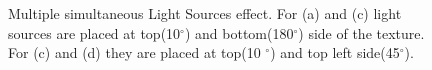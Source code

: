 \begin{figure}[h]
\centering
\caption{Multiple simultaneous Light Sources effect. For (a) and (c) light sources are placed at top(10$^{\circ}$) and bottom(180$^{\circ}$) side 
of the texture. For (c) and (d) they are placed at top(10 $^{\circ}$) and top left side(45$^{\circ}$). }
\end{figure}


